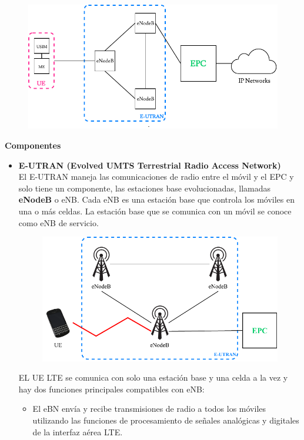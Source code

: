 \begin{itemize}
		
		\begin{figure}[ht!]
	\centering
	\includegraphics[scale=0.8]{Imagenes/arq4G.pdf}
	\end{figure}	
	\textbf{Componentes}
	\begin{itemize}
	\item \textbf{E-UTRAN (Evolved UMTS Terrestrial Radio Access Network)} \\
	El E-UTRAN maneja las comunicaciones de radio entre el móvil y el EPC y solo tiene un componente, las estaciones base evolucionadas, llamadas \textbf{eNodeB} o eNB. Cada eNB es una estación base que controla los móviles en una o más celdas. La estación base que se comunica con un móvil se conoce como eNB de servicio.
			\begin{figure}[ht!]
	\centering
	\includegraphics[scale=0.8]{Imagenes/arq4GEUTRAN.pdf}
	\end{figure}
   EL UE LTE se comunica con solo una estación base y una celda a la vez y hay dos funciones principales compatibles con eNB:
   \begin{itemize}
   \item El eBN envía y recibe transmisiones de radio a todos los móviles utilizando las funciones de procesamiento de señales analógicas y digitales de la interfaz aérea LTE.

\end{itemize}
\end{itemize}
\end{itemize}
